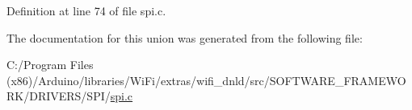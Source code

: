 Definition at line 74 of file spi.\+c.



The documentation for this union was generated from the following file\+:\begin{DoxyCompactItemize}
\item 
C\+:/\+Program Files (x86)/\+Arduino/libraries/\+Wi\+Fi/extras/wifi\+\_\+dnld/src/\+S\+O\+F\+T\+W\+A\+R\+E\+\_\+\+F\+R\+A\+M\+E\+W\+O\+R\+K/\+D\+R\+I\+V\+E\+R\+S/\+S\+P\+I/\hyperlink{spi_8c}{spi.\+c}\end{DoxyCompactItemize}
